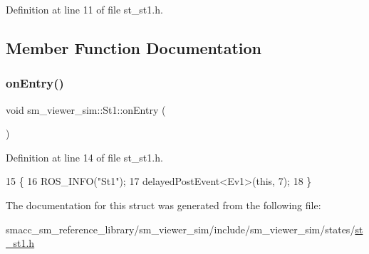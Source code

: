 Definition at line 11 of file st\+\_\+st1.\+h.



\subsection{Member Function Documentation}
\mbox{\label{structsm__viewer__sim_1_1St1_ab4651cd52d9db7f7e8a4496d8214bfbe}} 
\subsubsection{\texorpdfstring{on\+Entry()}{onEntry()}}
{\footnotesize\ttfamily void sm\+\_\+viewer\+\_\+sim\+::\+St1\+::on\+Entry (\begin{DoxyParamCaption}{ }\end{DoxyParamCaption})\hspace{0.3cm}{\ttfamily [inline]}}



Definition at line 14 of file st\+\_\+st1.\+h.


\begin{DoxyCode}
15     \{
16         ROS\_INFO(\textcolor{stringliteral}{"St1"});
17         delayedPostEvent<Ev1>(\textcolor{keyword}{this}, 7);
18     \}
\end{DoxyCode}


The documentation for this struct was generated from the following file\+:\begin{DoxyCompactItemize}
\item 
smacc\+\_\+sm\+\_\+reference\+\_\+library/sm\+\_\+viewer\+\_\+sim/include/sm\+\_\+viewer\+\_\+sim/states/\hyperlink{st__st1_8h}{st\+\_\+st1.\+h}\end{DoxyCompactItemize}
